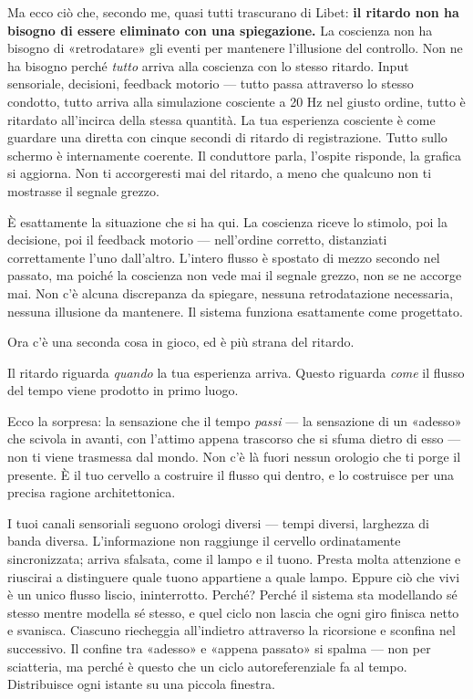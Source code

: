 \documentclass[11pt, twoside, openright]{book}
\begin{document}
Ma ecco ciò che, secondo me, quasi tutti trascurano di Libet: \textbf{il ritardo non ha bisogno di essere eliminato con una spiegazione.} La coscienza non ha bisogno di «retrodatare» gli eventi per mantenere l'illusione del controllo. Non ne ha bisogno perché \textit{tutto} arriva alla coscienza con lo stesso ritardo. Input sensoriale, decisioni, feedback motorio --- tutto passa attraverso lo stesso condotto, tutto arriva alla simulazione cosciente a 20 Hz nel giusto ordine, tutto è ritardato all'incirca della stessa quantità. La tua esperienza cosciente è come guardare una diretta con cinque secondi di ritardo di registrazione. Tutto sullo schermo è internamente coerente. Il conduttore parla, l'ospite risponde, la grafica si aggiorna. Non ti accorgeresti mai del ritardo, a meno che qualcuno non ti mostrasse il segnale grezzo.

È esattamente la situazione che si ha qui. La coscienza riceve lo stimolo, poi la decisione, poi il feedback motorio --- nell'ordine corretto, distanziati correttamente l'uno dall'altro. L'intero flusso è spostato di mezzo secondo nel passato, ma poiché la coscienza non vede mai il segnale grezzo, non se ne accorge mai. Non c'è alcuna discrepanza da spiegare, nessuna retrodatazione necessaria, nessuna illusione da mantenere. Il sistema funziona esattamente come progettato.

Ora c'è una seconda cosa in gioco, ed è più strana del ritardo.

Il ritardo riguarda \textit{quando} la tua esperienza arriva. Questo riguarda \textit{come} il flusso del tempo viene prodotto in primo luogo.

Ecco la sorpresa: la sensazione che il tempo \textit{passi} --- la sensazione di un «adesso» che scivola in avanti, con l'attimo appena trascorso che si sfuma dietro di esso --- non ti viene trasmessa dal mondo. Non c'è là fuori nessun orologio che ti porge il presente. È il tuo cervello a costruire il flusso qui dentro, e lo costruisce per una precisa ragione architettonica.

I tuoi canali sensoriali seguono orologi diversi --- tempi diversi, larghezza di banda diversa. L'informazione non raggiunge il cervello ordinatamente sincronizzata; arriva sfalsata, come il lampo e il tuono. Presta molta attenzione e riuscirai a distinguere quale tuono appartiene a quale lampo. Eppure ciò che vivi è un unico flusso liscio, ininterrotto. Perché? Perché il sistema sta modellando sé stesso mentre modella sé stesso, e quel ciclo non lascia che ogni giro finisca netto e svanisca. Ciascuno riecheggia all'indietro attraverso la ricorsione e sconfina nel successivo. Il confine tra «adesso» e «appena passato» si spalma --- non per sciatteria, ma perché è questo che un ciclo autoreferenziale fa al tempo. Distribuisce ogni istante su una piccola finestra.
\end{document}

